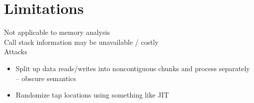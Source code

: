 \section{Limitations}

Not applicable to memory analysis \\

\noindent Call stack information may be unavailable / costly \\

\noindent
Attacks

\begin{itemize}
\item Split up data reads/writes into noncontiguous chunks and process separately -- obscure semantics
\item Randomize tap locations using something like JIT
\end{itemize}
